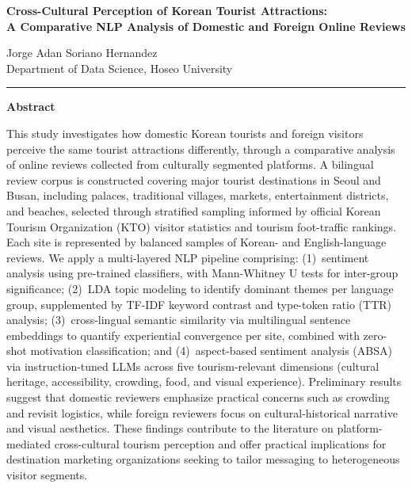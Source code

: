 \documentclass[11pt,a4paper]{article}
\begin{document}
\begin{center}
{\large\textbf{Cross-Cultural Perception of Korean Tourist Attractions:\\[3pt]
A Comparative NLP Analysis of Domestic and Foreign Online Reviews}}

\vspace{6pt}

{\normalsize Jorge Adan Soriano Hernandez}\\
{\small Department of Data Science, Hoseo University}

\end{center}

\vspace{6pt}
\noindent\rule{\linewidth}{0.4pt}
\vspace{4pt}

\noindent\textbf{Abstract}

\vspace{2pt}

\noindent
This study investigates how domestic Korean tourists and foreign visitors
perceive the same tourist attractions differently, through a comparative
analysis of online reviews collected from culturally segmented platforms.
A bilingual review corpus is constructed covering major tourist destinations
in Seoul and Busan, including palaces, traditional villages, markets,
entertainment districts, and beaches, selected through stratified sampling
informed by official Korean Tourism Organization (KTO) visitor statistics
and tourism foot-traffic rankings. Each site is represented by balanced
samples of Korean- and English-language reviews. We apply a multi-layered
NLP pipeline comprising: (1)~sentiment analysis using pre-trained classifiers,
with Mann-Whitney U tests for inter-group significance;
(2)~LDA topic modeling to identify dominant themes per language group,
supplemented by TF-IDF keyword contrast and type-token ratio (TTR) analysis;
(3)~cross-lingual semantic similarity via multilingual sentence embeddings
to quantify experiential convergence per site, combined with zero-shot
motivation classification; and (4)~aspect-based sentiment analysis (ABSA)
via instruction-tuned LLMs across five tourism-relevant dimensions
(cultural heritage, accessibility, crowding, food, and visual experience).
Preliminary results suggest that domestic reviewers emphasize practical
concerns such as crowding and revisit logistics, while foreign reviewers
focus on cultural-historical narrative and visual aesthetics. These findings
contribute to the literature on platform-mediated cross-cultural tourism
perception and offer practical implications for destination marketing
organizations seeking to tailor messaging to heterogeneous visitor segments.
\end{document}
